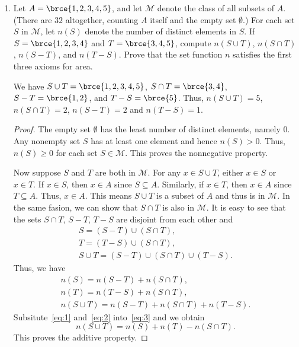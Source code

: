 \documentclass[a4paper]{article}
\begin{document}
\begin{enumerate}
\item Let \(A = \brce{1, 2, 3, 4, 5}\), and let \(\mathcal{M}\) denote the
  class of all subsets of \(A\).  (There are \(32\) altogether, counting
  \(A\) itself and the empty set \(\emptyset\).)  For each set \(S\) in
  \(\mathcal{M}\), let \(n(S)\) denote the number of distinct elements in
  \(S\).  If \(S = \brce{1, 2, 3, 4}\) and \(T = \brce{3, 4, 5}\), compute
  \(n(S \cup T)\), \(n(S \cap T)\), \(n(S - T)\), and \(n(T - S)\).  Prove
  that the set function \(n\) satisfies the first three axioms for area.

  We have \(S \cup T = \brce{1, 2, 3, 4, 5}\), \(S \cap T = \brce{3, 4}\),
  \(S - T = \brce{1, 2}\), and \(T - S = \brce{5}\).  Thus,
  \(n(S \cup T) = 5\), \(n(S \cap T) = 2\), \(n(S - T) = 2\) and
  \(n(T - S) = 1\).

  \begin{proof}
    The empty set \(\emptyset\) has the least number of distinct elements,
    namely \(0\).  Any nonempty set \(S\) has at least one element and hence
    \(n(S) > 0\).  Thus, \(n(S) \ge 0\) for each set \(S \in \mathcal{M}\).
    This proves the nonnegative property.

    Now suppose \(S\) and \(T\) are both in \(\mathcal{M}\).  For any
    \(x \in S \cup T\), either \(x \in S\) or \(x \in T\).  If \(x \in S\),
    then \(x \in A\) since \(S \subseteq A\).  Similarly, if \(x \in T\),
    then \(x \in A\) since \(T \subseteq A\).  Thus, \(x \in A\).  This
    means \(S \cup T\) is a subset of \(A\) and thus is in \(\mathcal{M}\).
    In the same fasion, we can show that \(S \cap T\) is also in
    \(\mathcal{M}\).  It is easy to see that the sets \(S \cap T\),
    \(S - T\), \(T - S\) are disjoint from each other and
    \begin{gather*}
      S = (S-T) \cup (S \cap T), \\
      T = (T-S) \cup (S \cap T), \\
      S \cup T = (S-T) \cup (S \cap T) \cup (T-S).
    \end{gather*}
    Thus, we have
    \begin{gather}
      \label{eq:1}
      n(S) = n(S-T) + n(S \cap T), \\
      \label{eq:2}
      n(T) = n(T-S) + n(S \cap T), \\
      \label{eq:3}
      n(S \cup T) = n(S - T) + n(S \cap T) + n(T - S).
    \end{gather}
    Subsitute~\eqref{eq:1} and~\eqref{eq:2} into~\eqref{eq:3} and we obtain
    \[
      n(S \cup T) = n(S) + n(T) - n(S \cap T).
    \]
    This proves the additive property.


\end{proof}
\end{enumerate}
\end{document}
